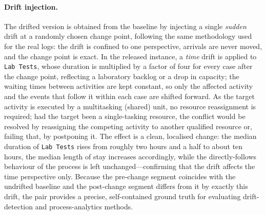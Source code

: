 \paragraph{Drift injection.}
The drifted version is obtained from the baseline by injecting a single \emph{sudden} drift at a randomly
chosen change point, following the same methodology used for the real logs: the drift is confined to one
perspective, arrivals are never moved, and the change point is exact. In the released instance, a
\emph{time} drift is applied to \texttt{Lab Tests}, whose duration is multiplied by a factor of four for
every case after the change point, reflecting a laboratory backlog or a drop in capacity; the waiting times
between activities are kept constant, so only the affected activity and the events that follow it within each
case are shifted forward. As the target activity is executed by a multitasking (shared) unit, no resource
reassignment is required; had the target been a single-tasking resource, the conflict would be resolved by
reassigning the competing activity to another qualified resource or, failing that, by postponing it. The
effect is a clean, localised change: the median duration of \texttt{Lab Tests} rises from roughly two hours
and a half to about ten hours, the median length of stay increases accordingly, while the directly-follows
behaviour of the process is left unchanged---confirming that the drift affects the time perspective only.
Because the pre-change segment coincides with the undrifted baseline and the post-change segment differs from
it by exactly this drift, the pair provides a precise, self-contained ground truth for evaluating
drift-detection and process-analytics methods.
